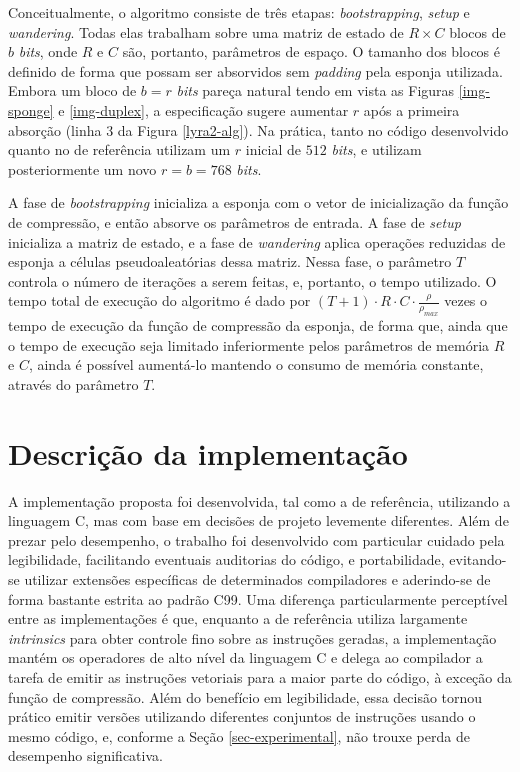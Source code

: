 \documentclass{article}
\begin{document}
Conceitualmente, o algoritmo consiste de três etapas: \emph{bootstrapping},
\emph{setup} e \emph{wandering}. Todas elas trabalham sobre uma matriz
de estado de $R \times C$ blocos de $b$ \emph{bits}, onde $R$ e $C$
são, portanto, parâmetros de espaço.
%
O tamanho dos blocos é definido de forma que possam ser absorvidos sem
\emph{padding} pela esponja utilizada. Embora um bloco de $b = r$ \emph{bits}
pareça natural tendo em vista as Figuras \ref{img-sponge} e
\ref{img-duplex}, a especificação sugere aumentar $r$ após a primeira
absorção (linha 3 da Figura \ref{lyra2-alg}). Na prática, tanto no
código desenvolvido quanto no de referência utilizam um $r$ inicial de $512$ \emph{bits},
e utilizam posteriormente um novo $r = b = 768$ \emph{bits}.

A fase de \emph{bootstrapping} inicializa a esponja com o vetor de
inicialização da função de compressão, e então absorve os parâmetros de
entrada. A fase de \emph{setup} inicializa a matriz de estado, e a fase
de \emph{wandering} aplica operações reduzidas de esponja a células
pseudoaleatórias dessa matriz. Nessa fase, o parâmetro $T$ controla o
número de iterações a serem feitas, e, portanto, o tempo utilizado.
O tempo total de execução do algoritmo é dado por
$(T + 1) \cdot R \cdot C \cdot \frac{\rho}{\rho_{max}}$ vezes o tempo
de execução da função de compressão da esponja, de forma que, ainda que
o tempo de execução seja limitado inferiormente pelos parâmetros de
memória $R$ e $C$, ainda é possível aumentá-lo mantendo o consumo de
memória constante, através do parâmetro $T$.

\section{Descrição da implementação}\label{sec-impl}

A implementação proposta foi desenvolvida, tal como a de referência, utilizando
a linguagem C, mas com base em decisões de projeto levemente diferentes. Além
de prezar pelo desempenho, o trabalho foi desenvolvido com particular cuidado
pela legibilidade, facilitando eventuais auditorias do código, e portabilidade,
evitando-se utilizar extensões específicas de determinados compiladores e
aderindo-se de forma bastante estrita ao padrão C99.
%
Uma diferença particularmente perceptível entre as implementações é que,
enquanto a de referência utiliza largamente \emph{intrinsics} para obter
controle fino sobre as instruções geradas, a implementação mantém os
operadores de alto nível da linguagem C e delega ao compilador a tarefa
de emitir as instruções vetoriais para a maior parte do código, à
exceção da função de compressão. Além do benefício em legibilidade, essa
decisão tornou prático emitir versões utilizando diferentes conjuntos de
instruções usando o mesmo código, e, conforme a Seção
\ref{sec-experimental}, não trouxe perda de desempenho significativa.
\end{document}

